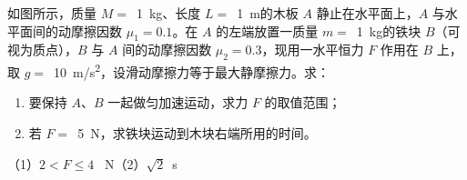 如图所示，质量 \(M =\) \,\qty{1}{kg}、长度 \(L =\) \,\qty{1}{m}的木板 \(A\) 静止在水平面上，\(A\) 与水平面间的动摩擦因数 \(\mu_1 = 0.1\)。在 \(A\) 的左端放置一质量 \(m =\) \,\qty{1}{kg}的铁块 \(B\)（可视为质点），\(B\) 与 \(A\) 间的动摩擦因数 \(\mu_2 = 0.3\)，现用一水平恒力 \(F\) 作用在 \(B\) 上，取 \(g =\) \,\qty{10}{m/s^2}，设滑动摩擦力等于最大静摩擦力。求：
\begin{enumerate}
	\item 要保持 \(A\)、\(B\) 一起做匀加速运动，求力 \(F\) 的取值范围；
	\item 若 \(F =\) \,\qty{5}{N}，求铁块运动到木块右端所用的时间。
\end{enumerate}

\begin{answer}
	（1）\(2 < F \leq 4\) \qty{}{N}（2）\(\sqrt{2}\)\qty{}{s}
\end{answer}
